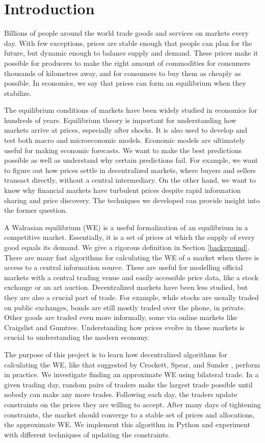 \documentclass[12pt,a4paper,titlepage]{article}
\begin{document}
\tableofcontents
\newpage

\section{Introduction}
Billions of people around the world trade goods and services on markets every day.
With few exceptions, prices are stable enough that people can plan for the future, but dynamic enough to balance supply and demand.
These prices make it possible for producers to make the right amount of commodities for consumers thousands of kilometres away, and for consumers to buy them as cheaply as possible.
In economics, we say that prices can form an equilibrium when they stabilize.

The equilibrium conditions of markets have been widely studied in economics for hundreds of years.
Equilibrium theory is important for understanding how markets arrive at prices, especially after shocks. 
It is also used to develop and test both macro and microeconomic models. 
Economic models are ultimately useful for making economic forecasts.
We want to make the best predictions possible as well as understand why certain predictions fail.
For example, we want to figure out how prices settle in decentralized markets, where buyers and sellers transact directly, without a central intermediary.
On the other hand, we want to know why financial markets have turbulent prices despite rapid information sharing and price discovery.
The techniques we developed can provide insight into the former question.

A Walrasian equilibrium (WE) is a useful formalization of an equilibrium in a competitive market.
Essentially, it is a set of prices at which the supply of every good equals its demand.
We give a rigorous definition in Section \ref{background}.
There are many fast algorithms for calculating the WE of a market when there is access to a central information source.
These are useful for modelling official markets with a central trading venue and easily accessible price data, like a stock exchange or an art auction.
Decentralized markets have been less studied, but they are also a crucial part of trade.
For example, while stocks are usually traded on public exchanges, bonds are still mostly traded over the phone, in private.
Other goods are traded even more informally, some via online markets like Craigslist and Gumtree.
Understanding how prices evolve in these markets is crucial to understanding the modern economy.

The purpose of this project is to learn how decentralized algorithms for calculating the WE, like that suggested by Crockett, Spear, and Sunder \cite{crockett}, perform in practice.
We investigate finding an approximate WE using bilateral trade.
In a given trading day, random pairs of traders make the largest trade possible until nobody can make any more trades. 
Following each day, the traders update constraints on the prices they are willing to accept.
After many days of tightening constraints, the market should converge to a stable set of prices and allocations, the approximate WE.
We implement this algorithm in Python and experiment with different techniques of updating the constraints.
\end{document}
